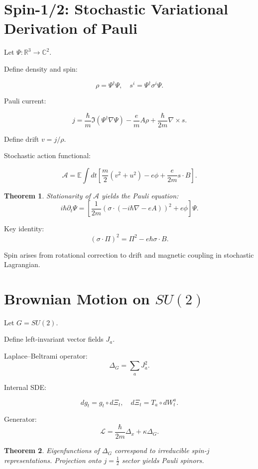 \documentclass[11pt]{article}
\newtheorem{theorem}{Theorem}
\begin{document}
\section{Spin-1/2: Stochastic Variational Derivation of Pauli}

Let $\Psi:\mathbb{R}^3\to\mathbb{C}^2$.

Define density and spin:

\[
\rho=\Psi^\dagger\Psi,
\quad
s^i=\Psi^\dagger\sigma^i\Psi.
\]

Pauli current:

\[
j=
\frac{\hbar}{m}\Im(\Psi^\dagger\nabla\Psi)
-\frac{e}{m}A\rho
+\frac{\hbar}{2m}\nabla\times s.
\]

Define drift $v=j/\rho$.

Stochastic action functional:

\[
\mathcal{A}
=
\mathbb{E}\int dt
\left[
\frac{m}{2}(v^2+u^2)
- e\phi
+ \frac{e}{2m}s\cdot B
\right].
\]

\begin{theorem}
Stationarity of $\mathcal{A}$ yields the Pauli equation:
\[
i\hbar\partial_t\Psi
=
\left[
\frac{1}{2m}(\sigma\cdot(-i\hbar\nabla-eA))^2
+ e\phi
\right]\Psi.
\]
\end{theorem}

Key identity:
\[
(\sigma\cdot\Pi)^2
=
\Pi^2 - e\hbar\sigma\cdot B.
\]

Spin arises from rotational correction to drift
and magnetic coupling in stochastic Lagrangian.

\section{Brownian Motion on $SU(2)$}

Let $G=SU(2)$.

Define left-invariant vector fields $J_a$.

Laplace–Beltrami operator:
\[
\Delta_G = \sum_a J_a^2.
\]

Internal SDE:

\[
dg_t = g_t\circ d\Xi_t,
\quad
d\Xi_t = T_a\circ dW^a_t.
\]

Generator:
\[
\mathcal{L}
=
\frac{\hbar}{2m}\Delta_x
+
\kappa\Delta_G.
\]

\begin{theorem}
Eigenfunctions of $\Delta_G$ correspond to irreducible
spin-$j$ representations. Projection onto $j=\frac12$
sector yields Pauli spinors.
\end{theorem}
\end{document}
